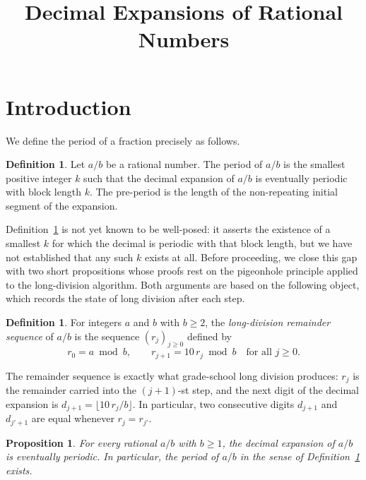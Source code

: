 \documentclass[12pt]{amsart}
\title{Decimal Expansions of Rational Numbers}
\newtheorem{proposition}[theorem]{Proposition}
\theoremstyle{definition}
\newtheorem{definition}[theorem]{Definition}
\theoremstyle{remark}
\begin{document}
\maketitle
\section*{Introduction}

We define the period of a fraction precisely as follows.

\begin{definition}\label{def:period}
Let $a/b$ be a rational number. The period of $a/b$ is the
smallest positive integer $k$ such that the decimal expansion of $a/b$
is eventually periodic with block length $k$. The pre-period is
the length of the non-repeating initial segment of the expansion.
\end{definition}

Definition~\ref{def:period} is not yet known to be well-posed: it
asserts the existence of a smallest $k$ for which the decimal is
periodic with that block length, but we have not established that any
such $k$ exists at all. Before proceeding, we close this gap with two
short propositions whose proofs rest on the pigeonhole principle
applied to the long-division algorithm. Both arguments are based on
the following object, which records the state of long division after
each step.

\begin{definition}\label{def:remainder-sequence}
For integers $a$ and $b$ with $b \ge 2$, the
\emph{long-division remainder sequence} of $a/b$ is the sequence
$(r_j)_{j \ge 0}$ defined by
\[
  r_0 = a \bmod b, \qquad r_{j+1} = 10\, r_j \bmod b
  \quad \text{for all } j \ge 0.
\]
\end{definition}

The remainder sequence is exactly what grade-school long division
produces: $r_j$ is the remainder carried into the $(j+1)$-st step, and
the next digit of the decimal expansion is $d_{j+1} =
\lfloor 10\, r_j / b \rfloor$. In particular, two consecutive digits
$d_{j+1}$ and $d_{j'+1}$ are equal whenever $r_j = r_{j'}$.

\begin{proposition}\label{prop:periodic-existence}
For every rational $a/b$ with $b \ge 1$, the decimal expansion of $a/b$
is eventually periodic. In particular, the period of $a/b$ in the
sense of Definition~\ref{def:period} exists.
\end{proposition}
\end{document}
